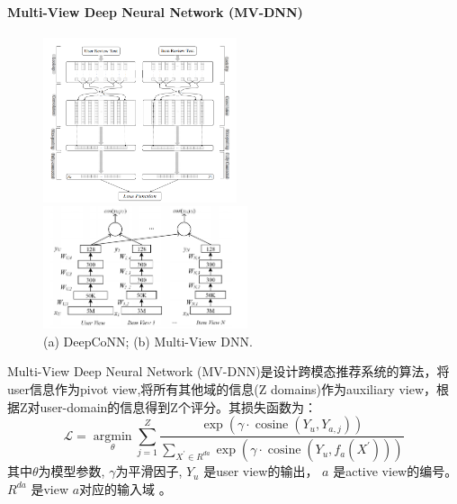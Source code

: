  \paragraph{Multi-View Deep Neural Network (MV-DNN)\cite{elkahky2015multi}}
\begin{figure}
\begin{center}
\begin{minipage}[t]{5.7cm}
\includegraphics[width=5.7cm]{MusicRecomSurvey/pics/deepconn.png}
\end{minipage}
\hspace{1cm}
\begin{minipage}[t]{6.0cm}
\includegraphics[width=6.0cm]{MusicRecomSurvey/pics/MVDNN2.png}
\end{minipage}
\caption{(a) DeepCoNN; (b) Multi-View DNN.}
\label{fig:deepconn}
\end{center}
\end{figure}
Multi-View Deep Neural Network (MV-DNN)是设计跨模态推荐系统的算法，将user信息作为pivot view,将所有其他域的信息(Z domains)作为auxiliary view，根据Z对user-domain的信息得到Z个评分。其损失函数为：
\begin{equation}
\mathcal{L}=\underset{\theta}{\operatorname{argmin}} \sum_{j=1}^{Z} \frac{\exp \left(\gamma \cdot \operatorname{cosine}\left(Y_{u}, Y_{a, j}\right)\right)}{\sum_{X^{\prime} \in R^{d a}} \exp \left(\gamma \cdot \operatorname{cosine}\left(Y_{u}, f_{a}\left(X^{\prime}\right)\right)\right)}
\end{equation}
其中$\theta$为模型参数, $\gamma$为平滑因子, $Y_{u}$ 是user view的输出， $a$ 是active view的编号。$R^{d a}$ 是view $a$对应的输入域 。 

